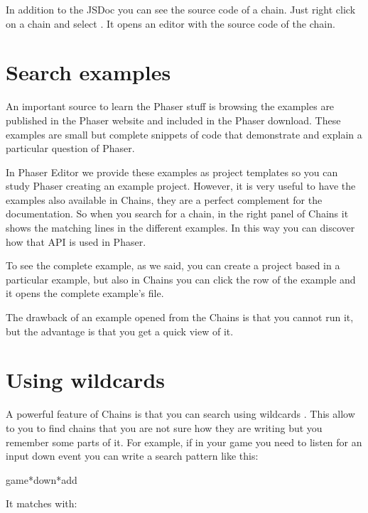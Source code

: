 \documentclass[letterpaper,10pt,english]{sphinxmanual}
\begin{document}
\noindent{}

In addition to the JSDoc you can see the source code of a chain. Just right click on a chain and select . It opens an editor with the source code of the chain.


\section{Search examples}
\label{\detokenize{chains:search-examples}}
An important source to learn the Phaser stuff is browsing the examples are published in the Phaser website and included in the Phaser download. These examples are small but complete snippets of code that demonstrate and explain a particular question of Phaser.

In Phaser Editor we provide these examples as project templates so you can study Phaser creating an example project. However, it is very useful to have the examples also available in Chains, they are a perfect complement for the  documentation. So when you search for a chain, in the right panel of Chains it shows the matching lines in the different examples. In this way you can discover how that API is used in Phaser.

To see the complete example, as we said, you can create a project based in a particular example, but also in Chains you can click the row of the example and it opens the complete example’s file.

The drawback of an example opened from the Chains is that you cannot run it, but the advantage is that you get a quick view of it.


\section{Using wildcards}
\label{\detokenize{chains:using-wildcards}}
A powerful feature of Chains is that you can search using wildcards \sphinxcode{*}. This allow to you to find chains that you are not sure how they are writing but you remember some parts of it. For example, if in your game you need to listen for an input down event you can write a search pattern like this:

\begin{sphinxVerbatim}[commandchars=\\\{\}]
game*down*add
\end{sphinxVerbatim}

It matches with:
\end{document}
